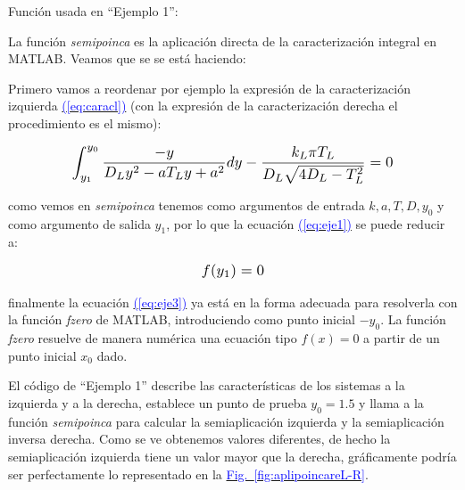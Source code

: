 \documentclass[12pt,a4paper]{report} %
\newcommand{\fref}[1]{\hyperref[#1]{\textcolor{blue}{Fig.~\ref*{#1}}}}
\newcommand{\eref}[1]{\hyperref[#1]{\textcolor{blue}{(\ref*{#1})}}}
\newcommand{\fref}[1]{\hyperref[#1]{\textcolor{blue}{\textit{Fig.~\ref*{#1}}}}}
\newcommand{\eref}[1]{\hyperref[#1]{\textcolor{blue}{\textit{(\ref*{#1})}}}}
\begin{document}
	\vspace{1cm}
	
	\vspace{1cm}
	
	\vspace{1cm}\noindent Función usada en ``Ejemplo 1'':
	\vspace{0.5cm}
	
	\newpage
	
	La función \textit{semipoinca} es la aplicación directa de la caracterización integral en MATLAB. Veamos que se se está haciendo:
	
	\vspace{0.5cm}\noindent Primero vamos a reordenar por ejemplo la expresión de la caracterización izquierda \eref{eq:caracl} (con la expresión de la caracterización derecha el procedimiento es el mismo):
	
	\begin{equation}
			\label{eq:eje1}
		\scalebox{1.2}{$\displaystyle
		\begin{gathered}
			\int_{y_1}^{y_0}\frac{-y}{D_Ly^2-aT_Ly+a^2}dy-\frac{k_L\pi T_L}{D_L\sqrt{4D_L-T_L^2}}=0
		\end{gathered}
			$}
	\end{equation}\smallskip
	
	\noindent como vemos en \textit{semipoinca} tenemos como argumentos de entrada $k,a,T,D,y_0$ y como argumento de salida $y_1$, por lo que la ecuación \eref{eq:eje1} se puede reducir a:
	
		\begin{equation}
		\label{eq:eje3}
		\scalebox{1.2}{$\displaystyle
				f(y_1)=0
			$}
	\end{equation}\smallskip
	
	\noindent finalmente la ecuación \eref{eq:eje3} ya está en la forma adecuada para resolverla con la función \textit{fzero} de MATLAB, introduciendo como punto inicial $-y_0$. La función \textit{fzero} resuelve de manera numérica una ecuación tipo $f(x)=0$ a partir de un punto inicial $x_0$ dado.
	
	\vspace{0.5cm}\noindent El código de ``Ejemplo 1'' describe las características de los sistemas a la izquierda y a la derecha, establece un punto de prueba $y_0=1.5$ y llama a la función \textit{semipoinca} para calcular la semiaplicación izquierda y la semiaplicación inversa derecha. Como se ve obtenemos valores diferentes, de hecho la semiaplicación izquierda tiene un valor mayor que la derecha, gráficamente podría ser perfectamente lo representado en la \fref{fig:aplipoincareL-R}.
	\newpage
	
\end{document}
